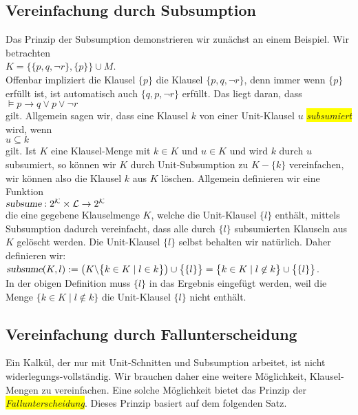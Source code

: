 \subsection{Vereinfachung durch Subsumption}
Das Prinzip der Subsumption demonstrieren wir zun\"{a}chst an einem Beispiel.
Wir betrachten \\[0.2cm]
\hspace*{1.3cm} $K = \bigl\{ \{p, q, \neg r\}, \{p\} \bigr\} \cup M$. \\[0.2cm]
Offenbar impliziert die Klausel $\{p\}$ die Klausel $\{p, q, \neg r\}$, denn immer wenn
$\{p\}$ erf\"{u}llt ist, ist automatisch auch $\{q, p, \neg r\}$ erf\"{u}llt.  Das liegt daran, dass 
\\[0.2cm]
\hspace*{1.3cm} $\models p \rightarrow q \vee p \vee \neg r$
\\[0.2cm]
gilt.  Allgemein sagen wir, dass eine Klausel $k$
 von einer Unit-Klausel $u$ \colorbox{yellow}{\emph{subsumiert}} wird, wenn
\\[0.2cm]
\hspace*{1.3cm} $u \subseteq k$ \\[0.2cm]
gilt.  Ist $K$ eine Klausel-Menge mit $k \in K$ und $u \in K$ und wird
$k$ durch $u$ subsumiert, so k\"{o}nnen wir $K$ durch Unit-Subsumption zu $K - \{k\}$
vereinfachen, wir k\"{o}nnen also die Klausel $k$ aus $K$ l\"{o}schen.  Allgemein definieren wir eine Funktion
\\[0.2cm]
\hspace*{1.3cm}
$\textsl{subsume}: 2^\mathcal{K} \times \mathcal{L} \rightarrow 2^\mathcal{K}$
\\[0.2cm]
die eine gegebene Klauselmenge $K$, welche die Unit-Klausel $\{l\}$ enth\"{a}lt, mittels Subsumption 
dadurch vereinfacht, dass alle durch $\{l\}$ subsumierten Klauseln aus $K$ gel\"{o}scht werden.
Die Unit-Klausel $\{l\}$ selbst behalten wir nat\"{u}rlich.  Daher definieren wir:
\\[0.2cm]
\hspace*{1.3cm}
$\textsl{subsume}(K, l) := 
\bigl(K \backslash \bigl\{ k \in K \mid l \in k \bigr\}\bigr) \cup \bigl\{\{l\}\bigr\} = 
\bigl\{ k \in K \mid l \not\in k \bigr\} \cup \bigl\{\{l\}\bigr\}$.
\\[0.2cm]
In der obigen Definition muss $\{l\}$ in das Ergebnis eingef\"{u}gt werden, weil die Menge
$\bigl\{ k \in K \mid l \not\in k \bigr\}$ die Unit-Klausel $\{l\}$ nicht enth\"{a}lt.


\subsection{Vereinfachung durch Fallunterscheidung}
Ein Kalk\"{u}l, der nur mit Unit-Schnitten und Subsumption arbeitet, ist nicht 
widerlegungs-vollst\"{a}ndig.  Wir brauchen 
daher eine weitere M\"{o}glichkeit, Klausel-Mengen zu vereinfachen.
Eine solche M\"{o}glichkeit bietet das Prinzip der
\colorbox{yellow}{\emph{Fallunterscheidung}}.  Dieses Prinzip basiert auf dem folgenden
Satz.

